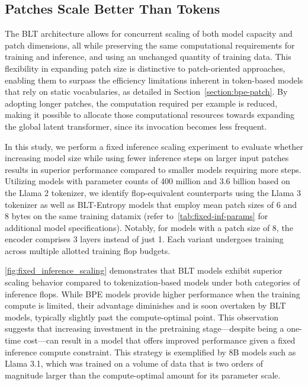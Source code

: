 \subsection{Patches Scale Better Than Tokens} The {\textsc BLT} architecture allows for concurrent scaling of both model capacity and patch dimensions, all while preserving the same computational requirements for training and inference, and using an unchanged quantity of training data. This flexibility in expanding patch size is distinctive to patch-oriented approaches, enabling them to surpass the efficiency limitations inherent in token-based models that rely on static vocabularies, as detailed in Section~\ref{section:bpe-patch}. By adopting longer patches, the computation required per example is reduced, making it possible to allocate those computational resources towards expanding the global latent transformer, since its invocation becomes less frequent.

In this study, we perform a fixed inference scaling experiment to evaluate whether increasing model size while using fewer inference steps on larger input patches results in superior performance compared to smaller models requiring more steps. Utilizing models with parameter counts of 400 million and 3.6 billion based on the Llama 2 tokenizer, we identify flop-equivalent counterparts using the Llama 3 tokenizer as well as {\textsc BLT}-Entropy models that employ mean patch sizes of 6 and 8 bytes on the same training datamix (refer to~\autoref{tab:fixed-inf-params} for additional model specifications). Notably, for models with a patch size of 8, the encoder comprises 3 layers instead of just 1. Each variant undergoes training across multiple allotted training flop budgets.

\autoref{fig:fixed_inference_scaling} demonstrates that {\textsc BLT} models exhibit superior scaling behavior compared to tokenization-based models under both categories of inference flops. While BPE models provide higher performance when the training compute is limited, their advantage diminishes and is soon overtaken by {\textsc BLT} models, typically slightly past the compute-optimal point. This observation suggests that increasing investment in the pretraining stage—despite being a one-time cost—can result in a model that offers improved performance given a fixed inference compute constraint. This strategy is exemplified by 8B models such as Llama 3.1, which was trained on a volume of data that is two orders of magnitude larger than the compute-optimal amount for its parameter scale.

